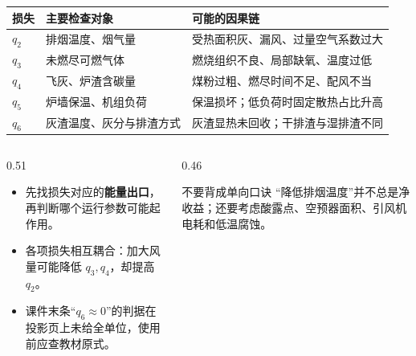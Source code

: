 \begin{frame}[t,shrink]{}
\begin{smalltab}
\begin{tabularx}{\linewidth}{@{}>{\bfseries}p{10mm}p{35mm}X@{}}
  \toprule
  损失 & 主要检查对象 & 可能的因果链\\
  \midrule
  \(q_2\) & 排烟温度、烟气量 & 受热面积灰、漏风、过量空气系数过大\\
  \(q_3\) & 未燃尽可燃气体 & 燃烧组织不良、局部缺氧、温度过低\\
  \(q_4\) & 飞灰、炉渣含碳量 & 煤粉过粗、燃尽时间不足、配风不当\\
  \(q_5\) & 炉墙保温、机组负荷 & 保温损坏；低负荷时固定散热占比升高\\
  \(q_6\) & 灰渣温度、灰分与排渣方式 & 灰渣显热未回收；干排渣与湿排渣不同\\
  \bottomrule
\end{tabularx}
\end{smalltab}
\begin{columns}[T,onlytextwidth]
\begin{column}{0.51\textwidth}
  \begin{itemize}
    \item 先找损失对应的\textbf{能量出口}，再判断哪个运行参数可能起作用。
    \item 各项损失相互耦合：加大风量可能降低 \(q_3,q_4\)，却提高 \(q_2\)。
    \item 课件末条“\(q_6\approx0\)”的判据在投影页上未给全单位，使用前应查教材原式。
  \end{itemize}
\end{column}
\begin{column}{0.46\textwidth}
  \begin{amberbox}{不要背成单向口诀}
  \small “降低排烟温度”并不总是净收益；还要考虑酸露点、空预器面积、引风机电耗和低温腐蚀。
  \end{amberbox}
\end{column}
\end{columns}
\end{frame}

